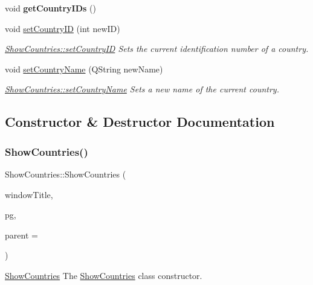 \begin{DoxyCompactItemize}
\mbox{\label{class_show_countries_aee1d49fc8829a0f240d42ecaac5481d7}} 
void {\bfseries get\+Country\+I\+Ds} ()
\item 
void \hyperlink{class_show_countries_a751b9d3c6859102f48d3ecc254135906}{set\+Country\+ID} (int new\+ID)
\begin{DoxyCompactList}\small\item\em \hyperlink{class_show_countries_a751b9d3c6859102f48d3ecc254135906}{Show\+Countries\+::set\+Country\+ID} Sets the current identification number of a country. \end{DoxyCompactList}\item 
void \hyperlink{class_show_countries_aefa9daeff484f4028ea5a280b280dd36}{set\+Country\+Name} (Q\+String new\+Name)
\begin{DoxyCompactList}\small\item\em \hyperlink{class_show_countries_aefa9daeff484f4028ea5a280b280dd36}{Show\+Countries\+::set\+Country\+Name} Sets a new name of the current country. \end{DoxyCompactList}\end{DoxyCompactItemize}


\subsection{Constructor \& Destructor Documentation}
\mbox{\label{class_show_countries_a509e0b6ebeb2fb580e7985b81b3f77e6}} 
\subsubsection{\texorpdfstring{Show\+Countries()}{ShowCountries()}}
{\footnotesize\ttfamily Show\+Countries\+::\+Show\+Countries (\begin{DoxyParamCaption}\item[{Q\+String}]{window\+Title,  }\item[{\hyperlink{classpsql}{psql} $\ast$}]{pg,  }\item[{Q\+Widget $\ast$}]{parent = {} }\end{DoxyParamCaption})\hspace{0.3cm}{\ttfamily [explicit]}}



\hyperlink{class_show_countries}{Show\+Countries} The \hyperlink{class_show_countries}{Show\+Countries} class constructor. 



